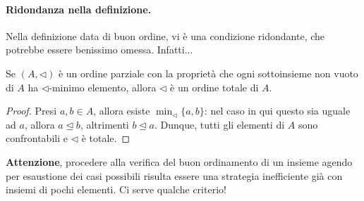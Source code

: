 \paragraph{Ridondanza nella definizione.} Nella definizione data di buon ordine, vi è una condizione ridondante, che potrebbe essere benissimo omessa. Infatti...
\begin{prp}
  Se \((A, \lhd)\) è un ordine parziale con la proprietà che ogni sottoinsieme non vuoto di \(A\) ha \(\lhd\)-minimo elemento, allora \(\lhd\) è un ordine totale di \(A\).
\end{prp}
\begin{proof}
  Presi \(a,b \in A\), allora esiste \(\min_\lhd \lbrace a,b \rbrace\): nel caso in qui questo sia uguale ad \(a\), allora \(a \unlhd b\), altrimenti \(b \unlhd a\). Dunque, tutti gli elementi di \(A\) sono confrontabili e \(\lhd\) è totale.
\end{proof}

{\bf Attenzione}, procedere alla verifica del buon ordinamento di un insieme agendo per esaustione dei casi possibili risulta essere una strategia inefficiente già con insiemi di pochi elementi. Ci serve qualche criterio!

